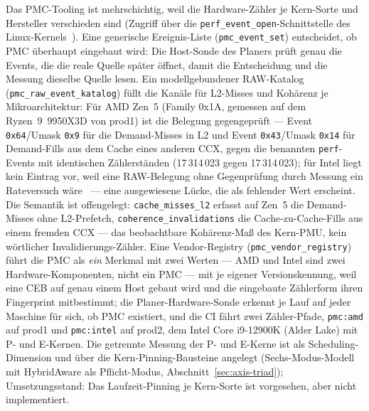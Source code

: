 \begin{nurlang}
Das PMC-Tooling ist mehrschichtig, weil die Hardware-Zähler je Kern-Sorte und Hersteller verschieden sind
(Zugriff über die \texttt{perf\_event\_open}-Schnittstelle des Linux-Kernels~\cite{linux_perf_event_open}).
Eine generische Ereignis-Liste (\texttt{pmc\_event\_set}) entscheidet, ob PMC überhaupt eingebaut wird:
Die Host-Sonde des Planers prüft genau die Events, die die reale Quelle später öffnet, damit die
Entscheidung und die Messung dieselbe Quelle lesen. Ein modellgebundener RAW-Katalog
(\texttt{pmc\_raw\_event\_katalog}) füllt die Kanäle für L2-Misses und Kohärenz je Mikroarchitektur: Für
AMD Zen~5 (Family 0x1A, gemessen auf dem Ryzen~9~9950X3D von prod1) ist die Belegung gegengeprüft --- Event %
\texttt{0x64}/Umask \texttt{0x9} für die Demand-Misses in L2 und Event \texttt{0x43}/Umask \texttt{0x14} %
für Demand-Fills aus dem Cache eines anderen CCX, gegen die benannten \texttt{perf}-Events mit
identischen Zählerständen (17\,314\,023 gegen 17\,314\,023); für Intel liegt kein Eintrag vor, weil eine
RAW-Belegung ohne Gegenprüfung durch Messung ein Rateversuch wäre~\cite{intel_sdm} --- eine ausgewiesene Lücke, die als
fehlender Wert erscheint. Die Semantik ist offengelegt: \texttt{cache\_misses\_l2} erfasst auf Zen~5 die
Demand-Misses ohne L2-Prefetch, \texttt{coherence\_invalidations} die Cache-zu-Cache-Fills aus einem fremden
CCX --- das beobachtbare Kohärenz-Maß des Kern-PMU, kein wörtlicher Invalidierungs-Zähler. Eine
Vendor-Registry (\texttt{pmc\_vendor\_registry}) führt die PMC als \emph{ein} Merkmal mit zwei Werten ---
AMD und Intel sind zwei Hardware-Komponenten, nicht ein PMC --- mit je eigener Versionskennung, weil eine
CEB auf genau einem Host gebaut wird und die eingebaute Zählerform ihren Fingerprint mitbestimmt; die
Planer-Hardware-Sonde erkennt je Lauf auf jeder Maschine für sich, ob PMC existiert, und die CI fährt zwei
Zähler-Pfade, \texttt{pmc:amd} auf prod1 und \texttt{pmc:intel} auf prod2, dem Intel Core i9-12900K
(Alder Lake) mit P- und E-Kernen. Die getrennte Messung der P- und E-Kerne ist als Scheduling-Dimension
und über die Kern-Pinning-Bausteine angelegt (Sechs-Modus-Modell mit HybridAware als Pflicht-Modus,
Abschnitt~\ref{sec:axis-triad}); Umsetzungsstand: Das Laufzeit-Pinning je Kern-Sorte ist
vorgesehen, aber nicht implementiert.
\end{nurlang}
